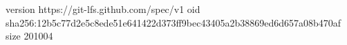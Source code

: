 version https://git-lfs.github.com/spec/v1
oid sha256:12b5c77d2e5c8ede51e641422d373ff9bec43405a2b38869ed6d657a08b470af
size 201004
